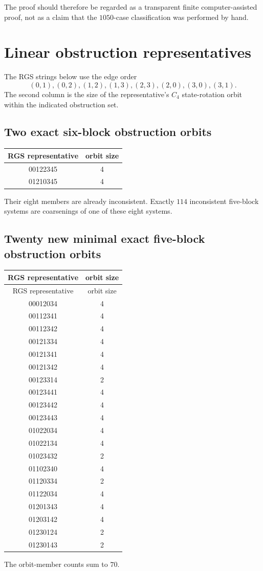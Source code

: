 \documentclass[11pt]{article}
\begin{document}
The proof should therefore be regarded as a transparent finite
computer-assisted proof, not as a claim that the $1050$-case classification was
performed by hand.

\appendix
\section{Linear obstruction representatives}\label{app:linear}
The RGS strings below use the edge order
\[
(0,1),(0,2),(1,2),(1,3),(2,3),(2,0),(3,0),(3,1).
\]
The second column is the size of the representative's $C_4$ state-rotation
orbit within the indicated obstruction set.

\subsection*{Two exact six-block obstruction orbits}
\begin{center}
\begin{tabular}{cc}
\toprule
RGS representative & orbit size\\
\midrule
00122345 & 4 \\
01210345 & 4 \\
\bottomrule
\end{tabular}
\end{center}
Their eight members are already inconsistent. Exactly $114$ inconsistent
five-block systems are coarsenings of one of these eight systems.

\subsection*{Twenty new minimal exact five-block obstruction orbits}
\begin{center}
\begin{longtable}{cc}
\toprule
RGS representative & orbit size\\
\midrule
\endfirsthead
\toprule
RGS representative & orbit size\\
\midrule
\endhead
00012034 & 4 \\
00112341 & 4 \\
00112342 & 4 \\
00121334 & 4 \\
00121341 & 4 \\
00121342 & 4 \\
00123314 & 2 \\
00123441 & 4 \\
00123442 & 4 \\
00123443 & 4 \\
01022034 & 4 \\
01022134 & 4 \\
01023432 & 2 \\
01102340 & 4 \\
01120334 & 2 \\
01122034 & 4 \\
01201343 & 4 \\
01203142 & 4 \\
01230124 & 2 \\
01230143 & 2 \\
\bottomrule
\end{longtable}
\end{center}
The orbit-member counts sum to $70$.
\end{document}
